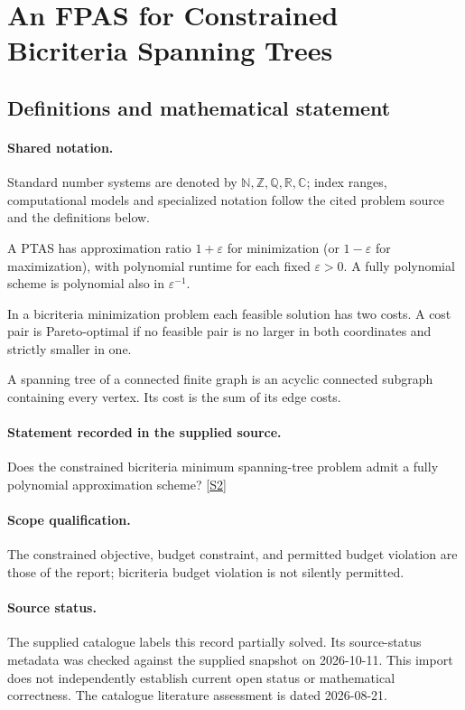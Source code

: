 \documentclass[11pt]{article}
\newcommand{\sref}[2]{\hyperlink{source:#1:#2}{[S#2]}}
\begin{document}
\section{An FPAS for Constrained Bicriteria Spanning Trees}\label{statement}

\subsection{Definitions and mathematical statement}

\paragraph{Shared notation.}Standard number systems are denoted by $\mathbb N,\mathbb Z,\mathbb Q,\mathbb R,\mathbb C$; index ranges, computational models and specialized notation follow the cited problem source and the definitions below.


A PTAS has approximation ratio $1+\varepsilon$ for minimization (or $1-\varepsilon$ for maximization), with polynomial runtime for each fixed $\varepsilon>0$. A fully polynomial scheme is polynomial also in $\varepsilon^{-1}$.

In a bicriteria minimization problem each feasible solution has two costs. A cost pair is Pareto-optimal if no feasible pair is no larger in both coordinates and strictly smaller in one.

A spanning tree of a connected finite graph is an acyclic connected subgraph containing every vertex. Its cost is the sum of its edge costs.
\paragraph{Statement recorded in the supplied source.}
Does the constrained bicriteria minimum spanning-tree problem admit a fully polynomial approximation scheme? \sref{statement}{2}
\paragraph{Scope qualification.}
The constrained objective, budget constraint, and permitted budget violation are those of the report; bicriteria budget violation is not silently permitted.
\paragraph{Source status.}
The supplied catalogue labels this record partially solved. Its source-status metadata was checked against the supplied snapshot on 2026-10-11. This import does not independently establish current open status or mathematical correctness. The catalogue literature assessment is dated 2026-08-21.
\end{document}

